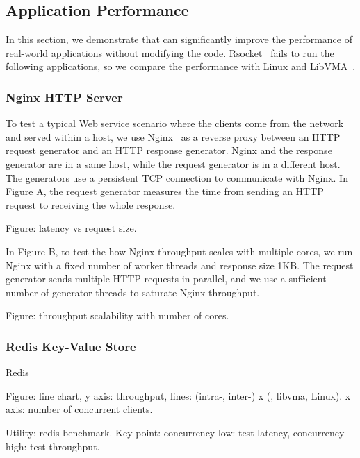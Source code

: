 \subsection{Application Performance}
\label{subsec:application}

In this section, we demonstrate that \sys{} can significantly improve the performance of real-world applications without modifying the code.
Rsocket~\cite{rsockets} fails to run the following applications, so we compare the performance with Linux and LibVMA~\cite{libvma}.

\subsubsection{Nginx HTTP Server}
\quad

To test a typical Web service scenario where the clients come from the network and served within a host, we use Nginx~\cite{nginx} as a reverse proxy between an HTTP request generator and an HTTP response generator.
Nginx and the response generator are in a same host, while the request generator is in a different host.
The generators use a persistent TCP connection to communicate with Nginx.
In Figure A, the request generator measures the time from sending an HTTP request to receiving the whole response.

Figure: latency vs request size.

In Figure B, to test the how Nginx throughput scales with multiple cores, we run Nginx with a fixed number of worker threads and response size 1KB.
The request generator sends multiple HTTP requests in parallel, and we use a sufficient number of generator threads to saturate Nginx throughput.

Figure: throughput scalability with number of cores.

\subsubsection{Redis Key-Value Store}
\quad

Redis~\cite{redis}

Figure: line chart, y axis: throughput, lines: (intra-, inter-) x (\sys{}, libvma, Linux). x axis: number of concurrent clients.

Utility: redis-benchmark.
Key point: concurrency low: test latency, concurrency high: test throughput.


